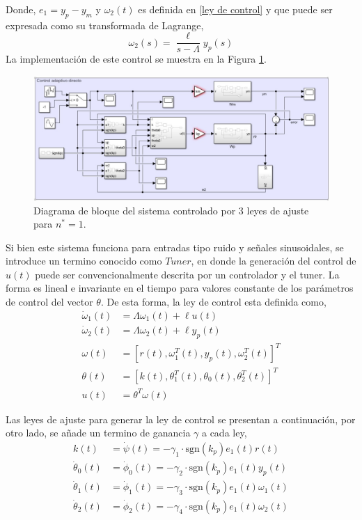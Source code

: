 \documentclass[letterpaper,11pt]{article} %
\begin{document}
Donde, $e_1 = y_p - y_m$ y $\omega_2(t)$ es definida en \eqref{ley de control} y que puede ser expresada como su transformada de Lagrange,
\begin{equation}
	\omega_2(s) = \frac{\ell}{s - \Lambda} y_p(s)
\end{equation}
La implementación de este control se muestra en la Figura \ref{controlsimple}.
\begin{figure}[h]
	\centering
	\captionsetup{justification=centering}
	\includegraphics[width=15cm]{controlsimple.png}
	\caption{Diagrama de bloque del sistema controlado por 3 leyes de ajuste para $n^* = 1$.}
	\label{controlsimple}
\end{figure}



Si bien este sistema funciona para entradas tipo ruido y señales sinusoidales, se introduce un termino conocido como $Tuner$, en donde la generación del control de $u(t)$ puede ser convencionalmente descrita por un controlador y el tuner. La forma es lineal e invariante en el tiempo para valores constante de los parámetros de control del vector $\theta$. De esta forma, la ley de control esta definida como,
\begin{align}
	\dot{\omega}_1(t) &= \Lambda \omega_1(t) + \ell u(t) \nonumber \\
	\dot{\omega}_2(t) &= \Lambda \omega_2(t) + \ell y_p(t) \nonumber \\
	\omega(t) &= [r(t), \omega_1^T(t), y_p(t), \omega_2^T(t)]^T \nonumber \\
	\theta(t) &= [k(t), \theta_1^T(t), \theta_0(t), \theta_2^T(t)]^T \nonumber \\
	u(t) &= \theta^T \omega(t)
	\label{vector}
\end{align}

Las leyes de ajuste para generar la ley de control se presentan a continuación, por otro lado, se añade un termino de ganancia $\gamma$ a cada ley,
\begin{align}
	k(t)  &= \dot{\psi}(t) = -\gamma_1 \cdot \mathrm{sgn}(k_p) e_1(t)r(t) \nonumber\\
	\dot{\theta}_0(t)  &= \dot{\phi}_0(t) = -\gamma_2 \cdot\mathrm{sgn}(k_p) e_1(t) y_p(t) \nonumber\\
	\dot{\theta}_1(t)  &= \dot{\phi}_1(t) = -\gamma_3\cdot\mathrm{sgn}(k_p) e_1(t) \omega_1(t) \nonumber\\
	\dot{\theta}_2(t) &= \dot{\phi}_2(t) = -\gamma_4\cdot\mathrm{sgn}(k_p) e_1(t) \omega_2(t) 
	\label{leyes1}
\end{align}
\end{document}
